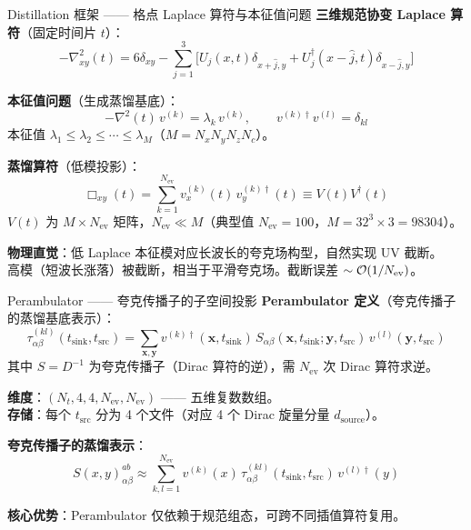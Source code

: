 \documentclass[10pt,aspectratio=169]{beamer}
\begin{document}
\begin{frame}{Distillation 框架 —— 格点 Laplace 算符与本征值问题}
\small
\textbf{三维规范协变 Laplace 算符}（固定时间片 $t$）：
\begin{equation}
  \boxed{
  -\nabla^2_{xy}(t) = 6\delta_{xy} - \sum_{j=1}^{3}
  \bigl[ U_j(x,t)\delta_{x+\hat{j},y} + U_j^\dagger(x-\hat{j},t)\delta_{x-\hat{j},y} \bigr]
  }
\end{equation}

\textbf{本征值问题}（生成蒸馏基底）：
\begin{equation}
  \boxed{
  -\nabla^2(t)\,v^{(k)} = \lambda_k\,v^{(k)},\qquad
  v^{(k)\dagger} v^{(l)} = \delta_{kl}
  }
\end{equation}
本征值 $\lambda_1 \le \lambda_2 \le \cdots \le \lambda_M$（$M = N_x N_y N_z N_c$）。

\textbf{蒸馏算符}（低模投影）：
\begin{equation}
  \boxed{
  \Box_{xy}(t) = \sum_{k=1}^{N_{\text{ev}}} v^{(k)}_x(t)\,v^{(k)\dagger}_y(t)
  \equiv V(t) V^\dagger(t)
  }
\end{equation}
$V(t)$ 为 $M \times N_{\text{ev}}$ 矩阵，$N_{\text{ev}} \ll M$（典型值 $N_{\text{ev}} = 100$，$M = 32^3 \times 3 = 98304$）。

\textbf{物理直觉}：低 Laplace 本征模对应长波长的夸克场构型，自然实现 UV 截断。\\
高模（短波长涨落）被截断，相当于平滑夸克场。截断误差 $\sim \order{1/N_{\text{ev}}}$。
\end{frame}

\begin{frame}{Perambulator —— 夸克传播子的子空间投影}
\small
\textbf{Perambulator 定义}（夸克传播子的蒸馏基底表示）：
\begin{equation}
  \boxed{
  \tau^{(kl)}_{\alpha\beta}(t_{\text{sink}}, t_{\text{src}}) =
  \sum_{\mathbf{x}, \mathbf{y}}
  v^{(k)\dagger}(\mathbf{x}, t_{\text{sink}})\,
  S_{\alpha\beta}(\mathbf{x},t_{\text{sink}}; \mathbf{y},t_{\text{src}})\,
  v^{(l)}(\mathbf{y}, t_{\text{src}})
  }
\end{equation}
其中 $S = D^{-1}$ 为夸克传播子（Dirac 算符的逆），需 $N_{\text{ev}}$ 次 Dirac 算符求逆。

\textbf{维度}：$(N_t, 4, 4, N_{\text{ev}}, N_{\text{ev}})$ —— 五维复数数组。\\
\textbf{存储}：每个 $t_{\text{src}}$ 分为 4 个文件（对应 4 个 Dirac 旋量分量 $d_{\text{source}}$）。

\textbf{夸克传播子的蒸馏表示}：
\begin{equation}
  S(x,y)_{\alpha\beta}^{ab} \approx \sum_{k,l=1}^{N_{\text{ev}}}
  v^{(k)}(x)\,\tau^{(kl)}_{\alpha\beta}(t_{\text{sink}}, t_{\text{src}})\,v^{(l)\dagger}(y)
\end{equation}

\textbf{核心优势}：Perambulator 仅依赖于规范组态，可跨不同插值算符复用。
\end{frame}
\end{document}
